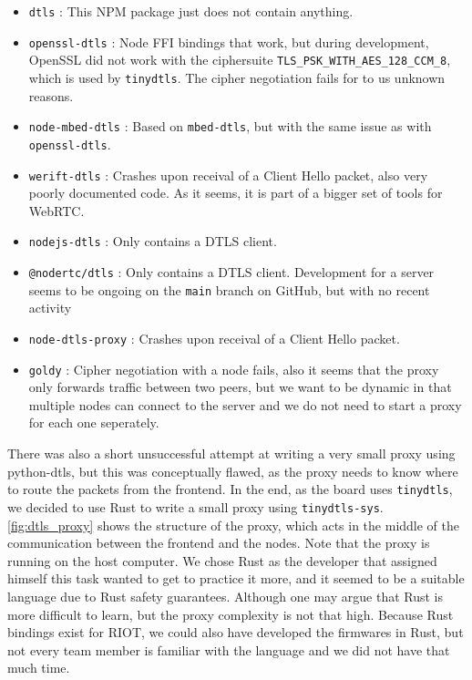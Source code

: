 \documentclass[acmtog, language=english, nonacm]{acmart}
\begin{document}
    \begin{itemize}
        \item \texttt{dtls} \cite{npm-dtls}: This NPM package just does not contain anything. 
        \item \texttt{openssl-dtls} \cite{npm-openssl-dtls}: Node FFI bindings that work, but during development, OpenSSL did not work with the ciphersuite \texttt{TLS\_PSK\_WITH\_AES\_128\_CCM\_8}, which is used by \texttt{tinydtls}. The cipher negotiation fails for to us unknown reasons.
        \item \texttt{node-mbed-dtls} \cite{npm-node-mbed-dtls}: Based on \texttt{mbed-dtls}, but with the same issue as with \texttt{openssl-dtls}.
        \item \texttt{werift-dtls} \cite{npm-werift-dtls}: Crashes upon receival of a Client Hello packet, also very poorly documented code. As it seems, it is part of a bigger set of tools for WebRTC.
        \item \texttt{nodejs-dtls} \cite{npm-nodejs-dtls}: Only contains a DTLS client.
        \item \texttt{@nodertc/dtls} \cite{npm-nodertc-dtls}: Only contains a DTLS client. Development for a server seems to be ongoing on the \texttt{main} branch on GitHub, but with no recent activity
        \item \texttt{node-dtls-proxy} \cite{npm-node-dtls-proxy}: Crashes upon receival of a Client Hello packet.
        \item \texttt{goldy} \cite{github-goldy}: Cipher negotiation with a node fails, also it seems that the proxy only forwards traffic between two peers, but we want to be dynamic in that multiple nodes can connect to the server and we do not need to start a proxy for each one seperately.
    \end{itemize}

    There was also a short unsuccessful attempt at writing a very small proxy using python-dtls, but this was conceptually flawed, as the proxy needs to know where to route the packets from the frontend. In the end, as the board uses \texttt{tinydtls}, we decided to use Rust to write a small proxy using \texttt{tinydtls-sys}. \cref{fig:dtls_proxy} shows the structure of the proxy, which acts in the middle of the communication between the frontend and the nodes. Note that the proxy is running on the host computer. We chose Rust as the developer that assigned himself this task wanted to get to practice it more, and it seemed to be a suitable language due to Rust safety guarantees. Although one may argue that Rust is more difficult to learn, but the proxy complexity is not that high. Because Rust bindings exist for RIOT, we could also have developed the firmwares in Rust, but not every team member is familiar with the language and we did not have that much time.
\end{document}
